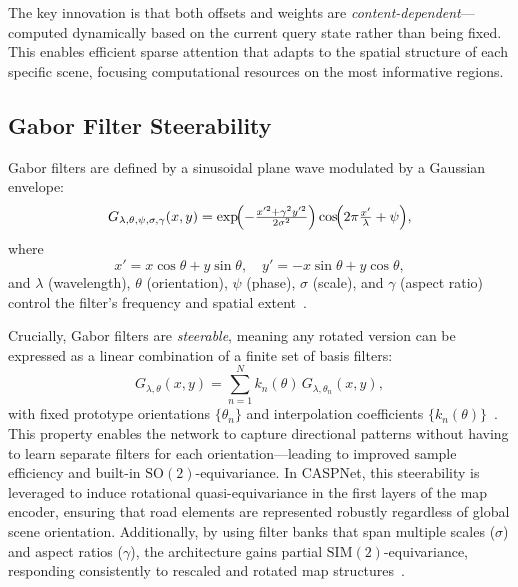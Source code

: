 The key innovation is that both offsets and weights are \emph{content-dependent}—computed dynamically based on the current query state rather than being fixed. This enables efficient sparse attention that adapts to the spatial structure of each specific scene, focusing computational resources on the most informative regions.

\subsection{Gabor Filter Steerability}
\label{ssec:gabor_filters}
Gabor filters are defined by a sinusoidal plane wave modulated by a Gaussian envelope:
\begin{equation}
\label{eq:gabor_filter}
G_{\lambda,\theta,\psi,\sigma,\gamma}(x,y)
= \exp\!\Bigl(-\tfrac{x'^{2} + \gamma^{2}y'^{2}}{2\sigma^{2}}\Bigr)
  \cos\!\Bigl(2\pi \tfrac{x'}{\lambda} + \psi\Bigr),
\end{equation}
where
\begin{equation}
\label{eq:gabor_rotation}
x' = x\cos\theta + y\sin\theta,\quad
y' = -x\sin\theta + y\cos\theta,
\end{equation}
and \(\lambda\) (wavelength), \(\theta\) (orientation), \(\psi\) (phase), \(\sigma\) (scale), and \(\gamma\) (aspect ratio) control the filter's frequency and spatial extent~\cite{Luan2018GCNN}.

Crucially, Gabor filters are \emph{steerable}, meaning any rotated version can be expressed as a linear combination of a finite set of basis filters:
\begin{equation}
\label{eq:gabor_steerability}
G_{\lambda,\theta}(x,y)
= \sum_{n=1}^N k_n(\theta)\,G_{\lambda,\theta_n}(x,y),
\end{equation}
with fixed prototype orientations \(\{\theta_n\}\) and interpolation coefficients \(\{k_n(\theta)\}\)~\cite{steerableGaborFilters}. This property enables the network to capture directional patterns without having to learn separate filters for each orientation—leading to improved sample efficiency and built-in \(\mathrm{SO}(2)\)-equivariance. In CASPNet, this steerability is leveraged to induce rotational quasi-equivariance in the first layers of the map encoder, ensuring that road elements are represented robustly regardless of global scene orientation. Additionally, by using filter banks that span multiple scales (\(\sigma\)) and aspect ratios (\(\gamma\)), the architecture gains partial \(\mathrm{SIM}(2)\)-equivariance, responding consistently to rescaled and rotated map structures~\cite{steerableGaborFilters}.

